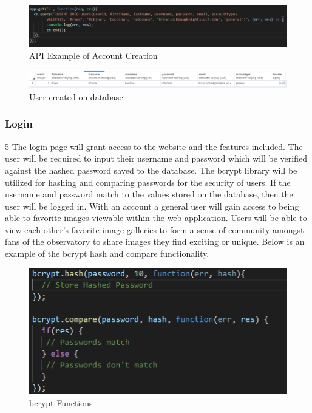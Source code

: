 \documentclass[12pt]{article}
\begin{document}
\begin{figure}[h]
	\centering
	\includegraphics[width=\linewidth]{api_raw_register}
	\caption{API Example of Account Creation}
	\label{fig:API Register}
\end{figure}

\begin{figure}[h]
	\centering
	\includegraphics[width=\linewidth]{database_user}
	\caption{User created on database}
	\label{fig:Database User}
\end{figure}

\subsubsection{Login}
5
The login page will grant access to the website and the features included.  The user will be required to input their username and password which will be verified against the hashed password saved to the database.  The bcrypt library will be utilized for hashing and comparing passwords for the security of users.  If the username and password match to the values stored on the database, then the user will be logged in.  With an account a general user will gain access to being able to favorite images viewable within the web application.  Users will be able to view each other’s favorite image galleries to form a sense of community amongst fans of the observatory to share images they find exciting or unique.  Below is an example of the bcrypt hash and compare functionality.

\begin{figure}[h]
	\centering
	\includegraphics[scale=0.5]{api_bcrypt}
	\caption{bcrypt Functions}
	\label{fig:API bcrypt}
\end{figure}
\end{document}
